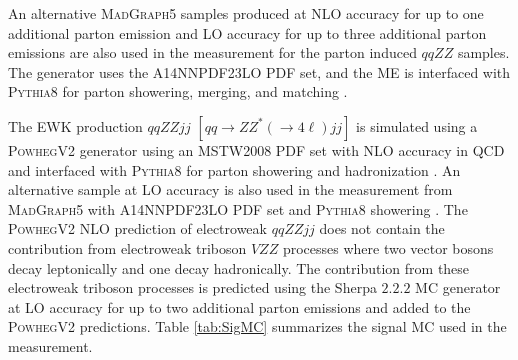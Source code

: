 An alternative \textsc{MadGraph5} samples produced at NLO accuracy for up to one additional parton emission and LO accuracy for up to three additional parton emissions \cite{MADGRAPHNLO} are also used in the measurement for the parton induced $qqZZ$ samples. The generator uses the A14NNPDF23LO PDF set, and the ME is interfaced with \textsc{Pythia8} for parton showering, merging, and matching \cite{Pythia8}. 

The EWK production $qqZZjj$ $[qq \rightarrow ZZ^{*}(\rightarrow 4 \ell) jj]$ is simulated using a \textsc{PowhegV2} generator using an MSTW2008 PDF set with NLO accuracy in QCD and interfaced with \textsc{Pythia8} for parton showering and hadronization \cite{PowhegV2}. An alternative sample at LO accuracy is also used in the measurement from \textsc{MadGraph5} with A14NNPDF23LO PDF set and \textsc{Pythia8} showering \cite{MADGRAPHNLO}. The \textsc{PowhegV2} NLO prediction of electroweak $qqZZjj$ does not contain the contribution from electroweak triboson $VZZ$ processes where two vector bosons decay leptonically and one decay hadronically. The contribution from these electroweak triboson processes is predicted using the {Sherpa} $2.2.2$ MC generator at LO accuracy for up to two additional parton emissions and added to the \textsc{PowhegV2} predictions. Table \ref{tab:SigMC} summarizes the signal MC used in the measurement. 

